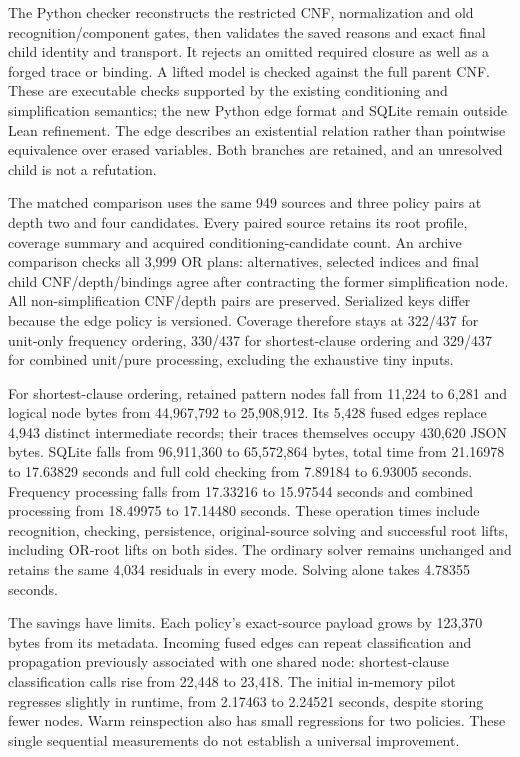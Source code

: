 \documentclass[11pt,a4paper]{article}
\numberwithin{equation}{section}
\theoremstyle{plain}
\theoremstyle{definition}
\theoremstyle{remark}
\begin{document}
The Python checker reconstructs the restricted CNF, normalization and old recognition/component gates, then validates the saved reasons and exact final child identity and transport. It rejects an omitted required closure as well as a forged trace or binding. A lifted model is checked against the full parent CNF. These are executable checks supported by the existing conditioning and simplification semantics; the new Python edge format and SQLite remain outside Lean refinement. The edge describes an existential relation rather than pointwise equivalence over erased variables. Both branches are retained, and an unresolved child is not a refutation.

The matched comparison uses the same 949 sources and three policy pairs at depth two and four candidates. Every paired source retains its root profile, coverage summary and acquired conditioning-candidate count. An archive comparison checks all 3,999 OR plans: alternatives, selected indices and final child CNF/depth/bindings agree after contracting the former simplification node. All non-simplification CNF/depth pairs are preserved. Serialized keys differ because the edge policy is versioned. Coverage therefore stays at 322/437 for unit-only frequency ordering, 330/437 for shortest-clause ordering and 329/437 for combined unit/pure processing, excluding the exhaustive tiny inputs.

For shortest-clause ordering, retained pattern nodes fall from 11,224 to 6,281 and logical node bytes from 44,967,792 to 25,908,912. Its 5,428 fused edges replace 4,943 distinct intermediate records; their traces themselves occupy 430,620 JSON bytes. SQLite falls from 96,911,360 to 65,572,864 bytes, total time from 21.16978 to 17.63829 seconds and full cold checking from 7.89184 to 6.93005 seconds. Frequency processing falls from 17.33216 to 15.97544 seconds and combined processing from 18.49975 to 17.14480 seconds. These operation times include recognition, checking, persistence, original-source solving and successful root lifts, including OR-root lifts on both sides. The ordinary solver remains unchanged and retains the same 4,034 residuals in every mode. Solving alone takes 4.78355 seconds.

The savings have limits. Each policy's exact-source payload grows by 123,370 bytes from its metadata. Incoming fused edges can repeat classification and propagation previously associated with one shared node: shortest-clause classification calls rise from 22,448 to 23,418. The initial in-memory pilot regresses slightly in runtime, from 2.17463 to 2.24521 seconds, despite storing fewer nodes. Warm reinspection also has small regressions for two policies. These single sequential measurements do not establish a universal improvement.
\end{document}
